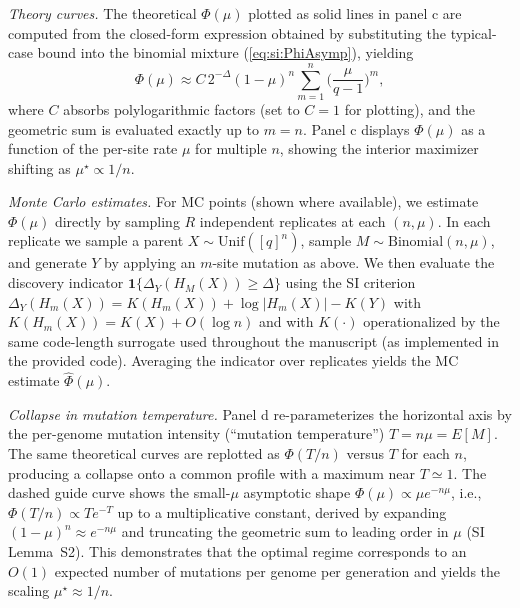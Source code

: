 \emph{Theory curves.} The theoretical $\Phi(\mu)$ plotted as solid lines in panel c are computed from the closed-form expression obtained by substituting the typical-case bound into the binomial mixture (\eqref{eq:si:PhiAsymp}), yielding
\[
\Phi(\mu)\approx C\,2^{-\Delta}(1-\mu)^n\sum_{m=1}^n\Big(\frac{\mu}{q-1}\Big)^m,
\]
where $C$ absorbs polylogarithmic factors (set to $C=1$ for plotting), and the geometric sum is evaluated exactly up to $m=n$. Panel c displays $\Phi(\mu)$ as a function of the per-site rate $\mu$ for multiple $n$, showing the interior maximizer shifting as $\mu^\star\propto 1/n$.

\emph{Monte Carlo estimates.} For MC points (shown where available), we estimate $\Phi(\mu)$ directly by sampling $R$ independent replicates at each $(n,\mu)$. In each replicate we sample a parent $X\sim\mathrm{Unif}([q]^n)$, sample $M\sim\mathrm{Binomial}(n,\mu)$, and generate $Y$ by applying an $m$-site mutation as above. We then evaluate the discovery indicator $\mathbf{1}\{\Delta_Y(H_M(X))\ge \Delta\}$ using the SI criterion $\Delta_Y(H_m(X)) = K(H_m(X))+\log|H_m(X)|-K(Y)$ with $K(H_m(X))=K(X)+O(\log n)$ and with $K(\cdot)$ operationalized by the same code-length surrogate used throughout the manuscript (as implemented in the provided code). Averaging the indicator over replicates yields the MC estimate $\widehat{\Phi}(\mu)$.

\emph{Collapse in mutation temperature.} Panel d re-parameterizes the horizontal axis by the per-genome mutation intensity (``mutation temperature'') $T=n\mu=E[M]$. The same theoretical curves are replotted as $\Phi(T/n)$ versus $T$ for each $n$, producing a collapse onto a common profile with a maximum near $T\simeq 1$. The dashed guide curve shows the small-$\mu$ asymptotic shape $\Phi(\mu)\propto \mu e^{-n\mu}$, i.e., $\Phi(T/n)\propto T e^{-T}$ up to a multiplicative constant, derived by expanding $(1-\mu)^n\approx e^{-n\mu}$ and truncating the geometric sum to leading order in $\mu$ (SI Lemma~S2). This demonstrates that the optimal regime corresponds to an $O(1)$ expected number of mutations per genome per generation and yields the scaling $\mu^\star\approx 1/n$.


